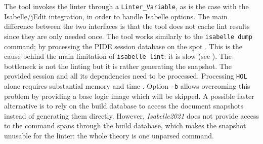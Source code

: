 The tool invokes the linter through a
\texttt{Linter\_Variable}, as is the case with the Isabelle/jEdit
integration, in order to handle Isabelle options. The main difference
between the two interfaces is that the tool does not cache lint results
since they are only needed once.
The tool works similarly to the 
\texttt{isabelle dump} command; by 
processing the PIDE session database on the spot \cite{isabelle-system}.
This is the cause behind the main limitation of \texttt{isabelle lint}:
it is slow (see ). The bottleneck is not the linting 
but it is rather generating the snapshot. The provided session and all its dependencies
need to be processed. Processing \texttt{HOL} alone requires substantial
memory and time \cite{isabelle-system}. Option \texttt{-b} 
allows overcoming this problem by providing a base logic image which will be
skipped. A possible faster alternative is to rely on the build database
to access the document snapshots instead of generating them
directly. However, \textit{Isabelle2021} does not provide access to 
the command spans through the build database, which makes the snapshot
unusable for the linter: the whole theory is one unparsed command.